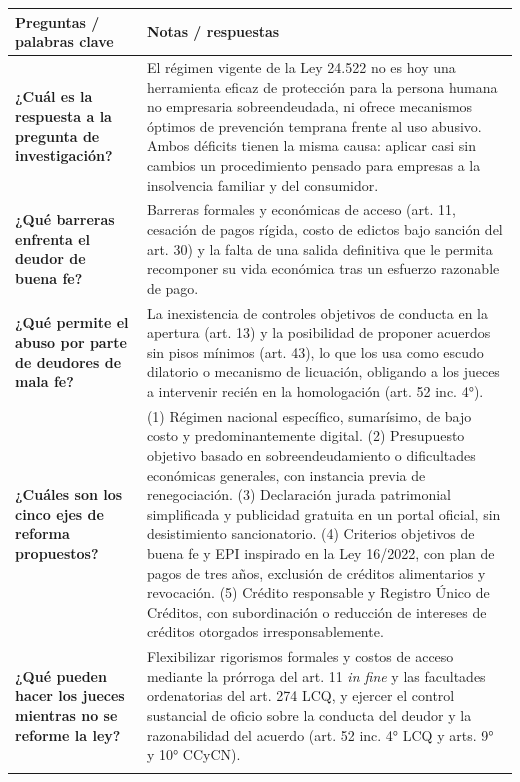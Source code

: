 \documentclass[12pt,oneside]{book}
\makeatletter
\newcommand{\cornellrow}[2]{\textbf{#1} & #2 \\ \addlinespace[0.8em]}
\newenvironment{cornell}[1]{%
    \par\medskip
    \noindent{\large\bfseries Cuadro Cornell --- #1}\par\smallskip
    \begin{longtable}{@{}>{\raggedright\arraybackslash}p{0.25\textwidth}>{\raggedright\arraybackslash}p{0.69\textwidth}@{}}
    \toprule
    \textbf{Preguntas / palabras clave} & \textbf{Notas / respuestas} \\
    \midrule
    \endhead
}{%
    \bottomrule
    \end{longtable}
}
\newcommand{\cornellsummary}[1]{%
    \midrule
    \multicolumn{2}{@{}p{\dimexpr0.94\textwidth+2\tabcolsep\relax}@{}}{\textbf{Resumen:} #1} \\
}
\makeatother
\begin{document}
\begin{cornell}{Conclusiones}
\cornellrow{¿Cuál es la respuesta a la pregunta de investigación?}{El régimen vigente de la Ley 24.522 no es hoy una herramienta eficaz de protección para la persona humana no empresaria sobreendeudada, ni ofrece mecanismos óptimos de prevención temprana frente al uso abusivo. Ambos déficits tienen la misma causa: aplicar casi sin cambios un procedimiento pensado para empresas a la insolvencia familiar y del consumidor.}
\cornellrow{¿Qué barreras enfrenta el deudor de buena fe?}{Barreras formales y económicas de acceso (art. 11, cesación de pagos rígida, costo de edictos bajo sanción del art. 30) y la falta de una salida definitiva que le permita recomponer su vida económica tras un esfuerzo razonable de pago.}
\cornellrow{¿Qué permite el abuso por parte de deudores de mala fe?}{La inexistencia de controles objetivos de conducta en la apertura (art. 13) y la posibilidad de proponer acuerdos sin pisos mínimos (art. 43), lo que los usa como escudo dilatorio o mecanismo de licuación, obligando a los jueces a intervenir recién en la homologación (art. 52 inc. 4°).}
\cornellrow{¿Cuáles son los cinco ejes de reforma propuestos?}{(1) Régimen nacional específico, sumarísimo, de bajo costo y predominantemente digital. (2) Presupuesto objetivo basado en sobreendeudamiento o dificultades económicas generales, con instancia previa de renegociación. (3) Declaración jurada patrimonial simplificada y publicidad gratuita en un portal oficial, sin desistimiento sancionatorio. (4) Criterios objetivos de buena fe y EPI inspirado en la Ley 16/2022, con plan de pagos de tres años, exclusión de créditos alimentarios y revocación. (5) Crédito responsable y Registro Único de Créditos, con subordinación o reducción de intereses de créditos otorgados irresponsablemente.}
\cornellrow{¿Qué pueden hacer los jueces mientras no se reforme la ley?}{Flexibilizar rigorismos formales y costos de acceso mediante la prórroga del art. 11 \textit{in fine} y las facultades ordenatorias del art. 274 LCQ, y ejercer el control sustancial de oficio sobre la conducta del deudor y la razonabilidad del acuerdo (art. 52 inc. 4° LCQ y arts. 9° y 10° CCyCN).}
\cornellsummary{La Ley 24.522 ni protege eficazmente al deudor honesto ni previene el abuso, por una misma causa estructural. La solución es un marco nacional equilibrado, con cinco ejes de reforma, y, hasta entonces, el uso de las herramientas judiciales de flexibilización formal y control sustancial del abuso.}
\end{cornell}
\end{document}
